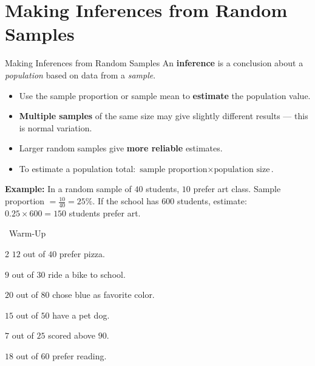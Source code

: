 \section{Making Inferences from Random Samples}

\begin{quickReview}{Making Inferences from Random Samples}
An \textbf{inference} is a conclusion about a \emph{population} based on data from a \emph{sample}.

\begin{itemize}[leftmargin=*]
    \item Use the sample proportion or sample mean to \textbf{estimate} the population value.
    \item \textbf{Multiple samples} of the same size may give slightly different results — this is normal variation.
    \item Larger random samples give \textbf{more reliable} estimates.
    \item To estimate a population total: $\text{sample proportion} \times \text{population size}$.
\end{itemize}

\medskip
\textbf{Example:} In a random sample of $40$ students, $10$ prefer art class. Sample proportion $= \frac{10}{40} = 25\%$. If the school has $600$ students, estimate: $0.25 \times 600 = 150$ students prefer art.
\end{quickReview}

\begin{practiceBox}[funGreen]{\faSun~Warm-Up}


\begin{multicols}{2}
\prob $12$ out of $40$ prefer pizza. \answerBlank[3cm]

\prob $9$ out of $30$ ride a bike to school. \answerBlank[3cm]

\prob $20$ out of $80$ chose blue as favorite color. \answerBlank[3cm]

\prob $15$ out of $50$ have a pet dog. \answerBlank[3cm]

\prob $7$ out of $25$ scored above $90$. \answerBlank[3cm]

\prob $18$ out of $60$ prefer reading. \answerBlank[3cm]
\end{multicols}
\end{practiceBox}


